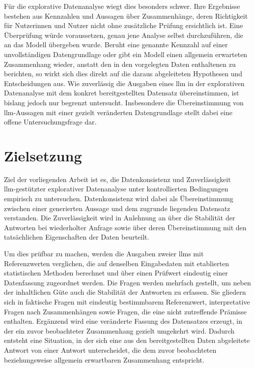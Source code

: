Für die explorative Datenanalyse wiegt dies besonders schwer. Ihre Ergebnisse bestehen aus Kennzahlen und Aussagen über Zusammenhänge, deren Richtigkeit für Nutzerinnen und Nutzer nicht ohne zusätzliche Prüfung ersichtlich ist. Eine Überprüfung würde voraussetzen, genau jene Analyse selbst durchzuführen, die an das Modell übergeben wurde. Beruht eine genannte Kennzahl auf einer unvollständigen Datengrundlage oder gibt ein Modell einen allgemein erwarteten Zusammenhang wieder, anstatt den in den vorgelegten Daten enthaltenen zu berichten, so wirkt sich dies direkt auf die daraus abgeleiteten Hypothesen und Entscheidungen aus. Wie zuverlässig die Ausgaben eines \gls{llm} in der explorativen Datenanalyse mit dem konkret bereitgestellten Datensatz übereinstimmen, ist bislang jedoch nur begrenzt untersucht. Insbesondere die Übereinstimmung von \gls{llm}-Aussagen mit einer gezielt veränderten Datengrundlage stellt dabei eine offene Untersuchungsfrage dar.

\section{Zielsetzung}

Ziel der vorliegenden Arbeit ist es, die Datenkonsistenz und Zuverlässigkeit \\ \gls{llm}-gestützter explorativer Datenanalyse unter kontrollierten Bedingungen empirisch zu untersuchen. Datenkonsistenz wird dabei als Übereinstimmung zwischen einer generierten Aussage und dem zugrunde liegenden Datensatz verstanden. Die Zuverlässigkeit wird in Anlehnung an \textcite{bornschlegl_towards_2024} über die Stabilität der Antworten bei wiederholter Anfrage sowie über deren Übereinstimmung mit den tatsächlichen Eigenschaften der Daten beurteilt.

Um dies prüfbar zu machen, werden die Ausgaben zweier \glspl{llm} mit Referenzwerten verglichen, die auf denselben Eingabedaten mit etablierten statistischen Methoden berechnet und über einen Prüfwert eindeutig einer Datenfassung zugeordnet werden. Die Fragen werden mehrfach gestellt, um neben der inhaltlichen Güte auch die Stabilität der Antworten zu erfassen. Sie gliedern sich in faktische Fragen mit eindeutig bestimmbarem Referenzwert, interpretative Fragen nach Zusammenhängen sowie Fragen, die eine nicht zutreffende Prämisse enthalten. Ergänzend wird eine veränderte Fassung des Datensatzes erzeugt, in der ein zuvor beobachteter Zusammenhang gezielt umgekehrt wird. Dadurch entsteht eine Situation, in der sich eine aus den bereitgestellten Daten abgeleitete Antwort von einer Antwort unterscheidet, die dem zuvor beobachteten beziehungsweise allgemein erwartbaren Zusammenhang entspricht.

